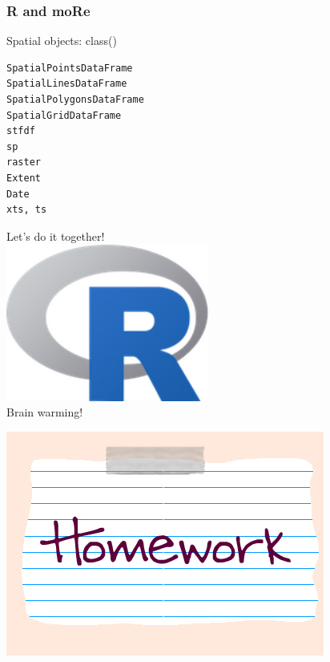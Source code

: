 \documentclass{beamer}
\begin{document}

\begin{frame}[fragile]
\frametitle{R and moRe}
\begin{exampleblock}{Spatial objects: class()}
\begin{verbatim}
SpatialPointsDataFrame
SpatialLinesDataFrame
SpatialPolygonsDataFrame
SpatialGridDataFrame
stfdf
sp
raster
Extent
Date
xts, ts
\end{verbatim}
\end{exampleblock}
\end{frame}


\begin{frame}
\centering
\Huge{Let's do it together!}\\
\includegraphics[width=0.5\textwidth]{Figures/Rlogo.png}\\
\alert{\Huge Brain warming!}
\end{frame}


\begin{frame}
\centering
\includegraphics[width=\textwidth]{Figures/homework.png}
\end{frame}
\end{document}
